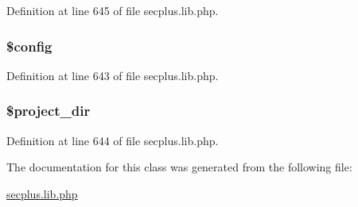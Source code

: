 Definition at line 645 of file secplus.lib.php.

\hypertarget{class_sec_plus_1_1_create_a49c7011be9c979d9174c52a8b83e5d8e}{
\subsubsection[{\$config}]{\setlength{\rightskip}{0pt plus 5cm}\$config}}
\label{class_sec_plus_1_1_create_a49c7011be9c979d9174c52a8b83e5d8e}


Definition at line 643 of file secplus.lib.php.

\hypertarget{class_sec_plus_1_1_create_a3f36281fff00b24d2d26e08841d336d9}{
\subsubsection[{\$project\_\-dir}]{\setlength{\rightskip}{0pt plus 5cm}\$project\_\-dir}}
\label{class_sec_plus_1_1_create_a3f36281fff00b24d2d26e08841d336d9}


Definition at line 644 of file secplus.lib.php.



The documentation for this class was generated from the following file:\begin{DoxyCompactItemize}
\item 
\hyperlink{secplus_8lib_8php}{secplus.lib.php}\end{DoxyCompactItemize}
